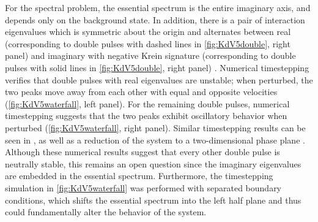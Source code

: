 \documentclass[12pt]{elsarticle}
\theoremstyle{plain}
\theoremstyle{definition}
\theoremstyle{remark}
\numberwithin{theorem}{section}
\numberwithin{equation}{section}
\begin{document}
\noi For the spectral problem, the essential spectrum is the entire imaginary axis, and depends only on the background state. In addition, there is a pair of interaction eigenvalues which is symmetric about the origin and alternates between real (corresponding to double pulses with dashed lines in \cref{fig:KdV5double}, right panel) and imaginary with negative Krein signature (corresponding to double pulses with solid lines in \cref{fig:KdV5double}, right panel) \cite{Pelinovsky2007}. Numerical timestepping verifies that double pulses with real eigenvalues are unstable; when perturbed, the two peaks move away from each other with equal and opposite velocities (\cref{fig:KdV5waterfall}, left panel). For the remaining double pulses, numerical timestepping suggests that the two peaks exhibit oscillatory behavior when perturbed (\cref{fig:KdV5waterfall}, right panel). Similar timestepping results can be seen in \cite[Figure 9]{Pelinovsky2007}, as well as a reduction of the system to a two-dimensional phase plane \cite[Figure 10]{Pelinovsky2007}. Although these numerical results suggest that every other double pulse is neutrally stable, this remains an open question since the imaginary eigenvalues are embedded in the essential spectrum. Furthermore, the timestepping simulation in \cref{fig:KdV5waterfall} was performed with separated boundary conditions, which shifts the essential spectrum into the left half plane and thus could fundamentally alter the behavior of the system.
\end{document}
